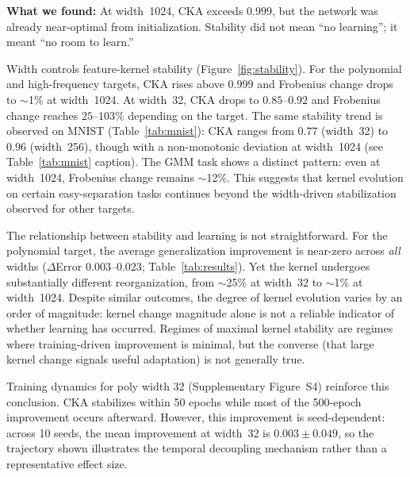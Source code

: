 \documentclass[twoside,11pt]{article}
\begin{document}
\noindent\textbf{What we found:} At width~1024, CKA exceeds $0.999$, but the network was already near-optimal from initialization. Stability did not mean ``no learning''; it meant ``no room to learn.''

Width controls feature-kernel stability (Figure~\ref{fig:stability}).  For the polynomial and high-frequency targets, CKA rises above $0.999$ and Frobenius change drops to $\sim$1\% at width~1024.  At width~32, CKA drops to $0.85$--$0.92$ and Frobenius change reaches $25$--$103\%$ depending on the target.  The same stability trend is observed on MNIST (Table~\ref{tab:mnist}): CKA ranges from $0.77$ (width~32) to $0.96$ (width~256), though with a non-monotonic deviation at width~1024 (see Table~\ref{tab:mnist} caption).  The GMM task shows a distinct pattern: even at width~1024, Frobenius change remains $\sim$12\%. This suggests that kernel evolution on certain easy-separation tasks continues beyond the width-driven stabilization observed for other targets.

The relationship between stability and learning is not straightforward.  For the polynomial target, the average generalization improvement is near-zero across \emph{all} widths ($\Delta$Error $0.003$--$0.023$; Table~\ref{tab:results}). Yet the kernel undergoes substantially different reorganization, from $\sim$25\% at width~32 to $\sim$1\% at width~1024.  Despite similar outcomes, the degree of kernel evolution varies by an order of magnitude: kernel change magnitude alone is not a reliable indicator of whether learning has occurred.  Regimes of maximal kernel stability are regimes where training-driven improvement is minimal, but the converse (that large kernel change signals useful adaptation) is not generally true.

Training dynamics for poly width 32 (Supplementary Figure~S4) reinforce this conclusion. CKA stabilizes within 50 epochs while most of the 500-epoch improvement occurs afterward. However, this improvement is seed-dependent: across 10 seeds, the mean improvement at width~32 is $0.003\pm0.049$, so the trajectory shown illustrates the temporal decoupling mechanism rather than a representative effect size.
\end{document}
